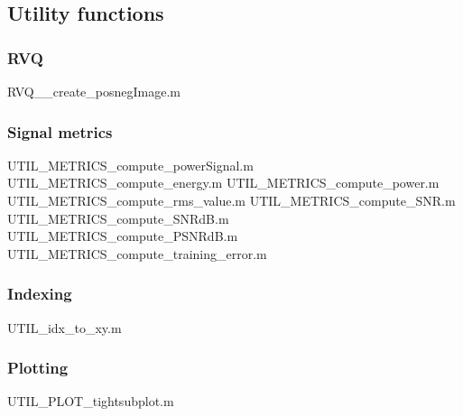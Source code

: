 \documentclass[12pt]{article}
\begin{document}
\subsection{Utility functions}


\subsubsection{RVQ}
							{RVQ__create_posnegImage.m}


\subsubsection{Signal metrics}
 				{UTIL_METRICS_compute_powerSignal.m} 	%
					{UTIL_METRICS_compute_energy.m}			%
 					{UTIL_METRICS_compute_power.m}			%
 				{UTIL_METRICS_compute_rms_value.m}		%
 						{UTIL_METRICS_compute_SNR.m}			%
 					{UTIL_METRICS_compute_SNRdB.m}			%
 					{UTIL_METRICS_compute_PSNRdB.m}		%
 			{UTIL_METRICS_compute_training_error.m}	%


\subsubsection{Indexing}
										{UTIL_idx_to_xy.m}

\subsubsection{Plotting}
								{UTIL_PLOT_tightsubplot.m}
\end{document}

